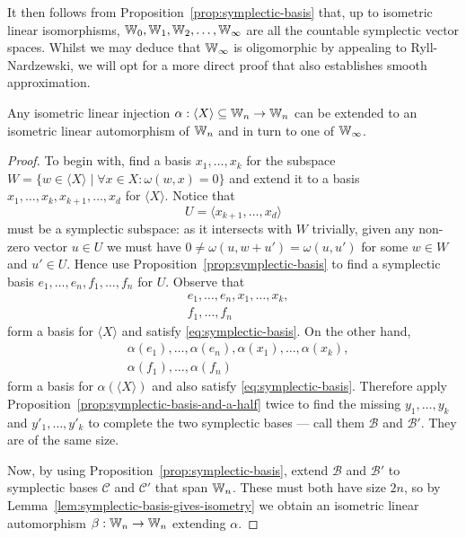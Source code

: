 It then follows from Proposition~\ref{prop:symplectic-basis} that, 
up to isometric linear isomorphisms, 
$\mathbb{W}_0, \mathbb{W}_1, \mathbb{W}_2, \ldots, \mathbb{W}_\infty$ are all the countable symplectic vector spaces.
Whilst we may deduce that $\mathbb{W}_\infty$ is oligomorphic by appealing to Ryll-Nardzewski,
we will opt for a more direct proof that also establishes smooth approximation.

\begin{proposition} \label{prop:symplectic-witt-extension}
    Any isometric linear injection $\alpha : \langle X \rangle \subseteq \mathbb{W}_n \to \mathbb{W}_n$ 
    can be extended to an isometric linear automorphism of $\mathbb{W}_n$
    and in turn to one of $\mathbb{W}_\infty$.
\end{proposition}

\begin{proof}
    To begin with, find a basis $x_1, \ldots, x_k$ for the subspace $W = \{ w \in \langle X \rangle \mid \forall x \in X : \omega(w, x) = 0 \}$ 
    and extend it to a basis \(
        x_1, \ldots, x_k, x_{k+1}, \ldots, x_d
    \) for $\langle X \rangle$.
    Notice that
    \[
        U = \langle x_{k+1}, \ldots, x_d \rangle
    \] must be a symplectic subspace:
    as it intersects with $W$ trivially, 
    given any non-zero vector $u \in U$ we must have $0 \neq \omega(u, w + u') = \omega(u, u')$ for some $w \in W$ and $u' \in U$.
    Hence use Proposition~\ref{prop:symplectic-basis} to find a symplectic basis
    \(
        e_1, \ldots, e_n,
        f_1, \ldots, f_n
    \)
    for $U$.
    Observe that 
    \begin{align*}
        &e_1, \ldots, e_n, x_1, \ldots, x_k, \\
        &f_1, \ldots, f_n
    \end{align*}
    form a basis for $\langle X \rangle$ and satisfy \eqref{eq:symplectic-basis}.
    On the other hand,
    \begin{align*}
        &\alpha(e_1), \ldots, \alpha(e_n), \alpha(x_1), \ldots, \alpha(x_k), \\
        &\alpha(f_1), \ldots, \alpha(f_n)
    \end{align*}
    form a basis for $\alpha(\langle X \rangle)$ and also satisfy \eqref{eq:symplectic-basis}.
    Therefore apply Proposition~\ref{prop:symplectic-basis-and-a-half} twice to find the missing 
    $y_1, \ldots, y_k$ and $y'_1, \ldots, y'_k$ to complete the two symplectic bases --- call them $\mathcal{B}$ and $\mathcal{B}'$.
    They are of the same size.

    Now, by using Proposition~\ref{prop:symplectic-basis}, extend $\mathcal{B}$ and $\mathcal{B}'$ to symplectic bases $\mathcal{C}$ and $\mathcal{C}'$ that span $\mathbb{W}_n$.
    These must both have size $2n$, 
    so by Lemma~\ref{lem:symplectic-basis-gives-isometry} we obtain an isometric linear automorphism $\beta : \mathbb{W}_n \to \mathbb{W}_n$ extending $\alpha$.


\end{proof}
